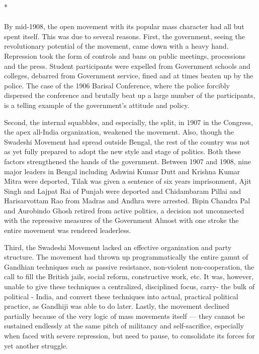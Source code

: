 \begin{center}*\end{center}

\paragraph*{}

By mid-1908, the open movement with its popular mass character had all but spent itself. This was due to several reasons. First, the government, seeing the revolutionary potential of the movement, came down with a heavy hand. Repression took the form of controls and bans on public meetings, processions and the press. Student participants were expelled from Government schools and colleges, debarred from Government service, fined and at times beaten up by the police. The case of the 1906 Barisal Conference, where the police forcibly dispersed the conference and brutally beat up a large number of the participants, is a telling example of the government's attitude and policy.

Second, the internal squabbles, and especially, the split, in 1907 in the Congress, the apex all-India organization, weakened the movement. Also, though the Swadeshi Movement had spread outside Bengal, the rest of the country was not as yet fully prepared to adopt the new style and stage of politics. Both these factors strengthened the hands of the government. Between 1907 and 1908, nine major leaders in Bengal including Ashwini Kumar Dutt and Krishna Kumar Mitra were deported, Tilak was given a sentence of six years imprisonment, Ajit Singh and Lajpat Rai of Punjab were deported and Chidambaram Pillai and Harisarvottam Rao from Madras and Andhra were arrested. Bipin Chandra Pal and Aurobindo Ghosh retired from active politics, a decision not unconnected with the repressive measures of the Government Almost with one stroke the entire movement was rendered leaderless.

Third, the Swadeshi Movement lacked an effective organization and party structure. The movement had thrown up programmatically the entire gamut of Gandhian techniques such as passive resistance, non-violent non-cooperation, the call to fill the British jails, social reform, constructive work, etc. It was, however, unable to give these techniques a centralized, disciplined focus, carry- the bulk of political - India, and convert these techniques into actual, practical political practice, as Gandhiji was able to do later. Lastly, the movement declined partially because of the very logic of mass movements itself --- they cannot be sustained endlessly at the same pitch of militancy and self-sacrifice, especially when faced with severe repression, but need to pause, to consolidate its forces for yet another struggle.

